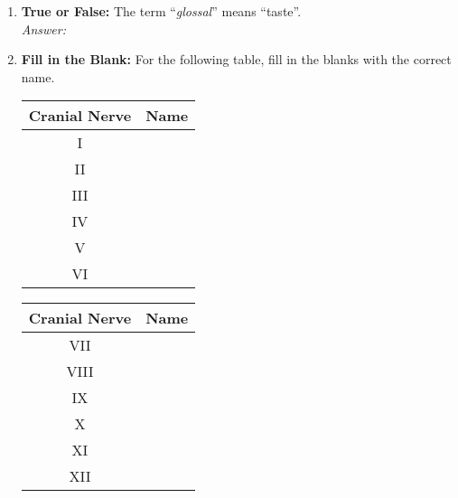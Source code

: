 \begin{enumerate}[label=\textbf{Q1.7.\arabic*}]
      \item \textbf{True or False:} The term ``\textit{glossal}'' means ``taste''. \\
            \textit{Answer:} %

      \item \textbf{Fill in the Blank:} For the following table, fill in the blanks with the correct name.
            \begin{multicols}{2}
                  \begin{tabular}{cc}
                        \toprule
                        \textbf{Cranial Nerve} & \textbf{Name}            \\ \midrule
                        I                      & \underline{\hspace{3cm}} \\[0.5em]
                        II                     & \underline{\hspace{3cm}} \\[0.5em]
                        III                    & \underline{\hspace{3cm}} \\[0.5em]
                        IV                     & \underline{\hspace{3cm}} \\[0.5em]
                        V                      & \underline{\hspace{3cm}} \\[0.5em]
                        VI                     & \underline{\hspace{3cm}} \\[0.5em]
                        \bottomrule
                  \end{tabular}
                  \begin{tabular}{cc}
                        \toprule
                        \textbf{Cranial Nerve} & \textbf{Name}            \\ \midrule
                        VII                    & \underline{\hspace{3cm}} \\[0.5em]
                        VIII                   & \underline{\hspace{3cm}} \\[0.5em]
                        IX                     & \underline{\hspace{3cm}} \\[0.5em]
                        X                      & \underline{\hspace{3cm}} \\[0.5em]
                        XI                     & \underline{\hspace{3cm}} \\[0.5em]
                        XII                    & \underline{\hspace{3cm}} \\[0.5em]
                        \bottomrule
                  \end{tabular}
            \end{multicols}

\end{enumerate}

